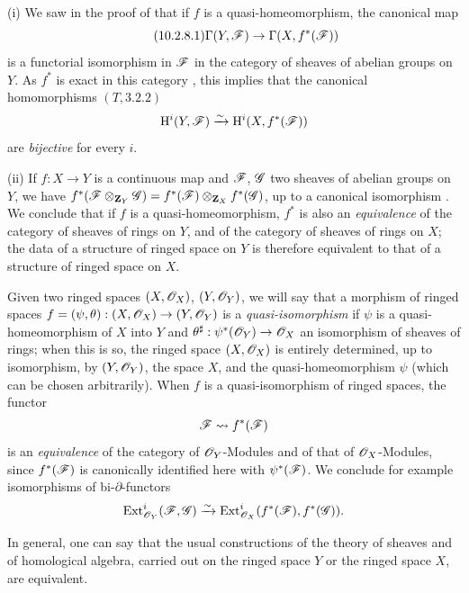 \begin{remarks}[10.2.8]
\label{IV.10.2.8}
(i) We saw in the proof of  that if $f$ is a quasi-homeomorphism, the canonical map
\begin{equation}
\label{IV.10.2.8.1}
\tag{10.2.8.1}
\Gamma(Y,\mathscr{F})\to\Gamma(X,f^*(\mathscr{F}))
\end{equation}
is a functorial isomorphism in $\mathscr{F}$ in the category of sheaves of abelian groups on $Y$.
As $f^*$ is exact in this category , this implies that the canonical homomorphisms $(T,3.2.2)$
\[
  \mathrm{H}^i(Y,\mathscr{F})\xrightarrow{\sim}\mathrm{H}^i(X,f^*(\mathscr{F}))
\]
are \emph{bijective} for every $i$.

(ii) If $f:X\to Y$ is a continuous map and $\mathscr{F}$, $\mathscr{G}$ two sheaves of abelian groups on $Y$, we have $f^*(\mathscr{F}\otimes_{\mathbf{Z}_Y}\mathscr{G})=f^*(\mathscr{F})\otimes_{\mathbf{Z}_X}f^*(\mathscr{G})$, up to a canonical isomorphism .
We conclude that if $f$ is a quasi-homeomorphism, $f^*$ is also an \emph{equivalence} of the category of sheaves of rings on $Y$, and of the category of sheaves of rings on $X$; the data of a structure of ringed space on $Y$ is therefore equivalent to that of a structure of ringed space on $X$.

Given two ringed spaces $(X,\mathscr{O}_X)$, $(Y,\mathscr{O}_Y)$, we will say that a morphism of ringed spaces $f=(\psi,\theta):(X,\mathscr{O}_X)\to(Y,\mathscr{O}_Y)$ is a \emph{quasi-isomorphism} if $\psi$ is a quasi-homeomorphism of $X$ into $Y$ and $\theta^\sharp:\psi^*(\mathscr{O}_Y)\to\mathscr{O}_X$ an isomorphism of sheaves of rings; when this is so, the ringed space $(X,\mathscr{O}_X)$ is entirely determined, up to isomorphism, by $(Y,\mathscr{O}_Y)$, the space $X$, and the quasi-homeomorphism $\psi$ (which can be chosen arbitrarily).
When $f$ is a quasi-isomorphism of ringed spaces, the functor
\[
  \mathscr{F}\leadsto f^*(\mathscr{F})
\]
is an \emph{equivalence} of the category of $\mathscr{O}_Y$-Modules and of that of $\mathscr{O}_X$-Modules, since $f^*(\mathscr{F})$ is canonically identified here with $\psi^*(\mathscr{F})$.
We conclude for example isomorphisms of bi-$\partial$-functors
\[
  \operatorname{Ext}^i_{\mathscr{O}_Y}(\mathscr{F},\mathscr{G})\xrightarrow{\sim}\operatorname{Ext}^i_{\mathscr{O}_X}(f^*(\mathscr{F}),f^*(\mathscr{G})).
\]

In general, one can say that the usual constructions of the theory of sheaves and of homological algebra, carried out on the ringed space $Y$ or the ringed space $X$, are equivalent.
\end{remarks}

